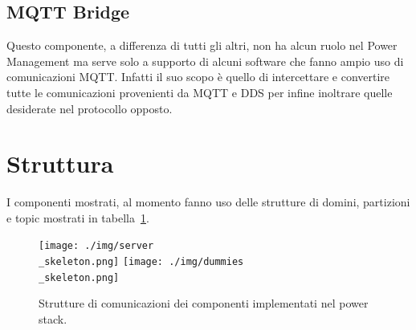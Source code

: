 \subsection*{MQTT Bridge}
Questo componente, a differenza di tutti gli altri, non ha alcun ruolo nel Power Management ma serve solo a supporto di alcuni software che fanno ampio uso di comunicazioni MQTT\cite{mqtt}. Infatti il suo scopo è quello di intercettare e convertire tutte le comunicazioni provenienti da MQTT e DDS per infine inoltrare quelle desiderate nel protocollo opposto.%

\section{Struttura}
I componenti mostrati, al momento fanno uso delle strutture di domini, partizioni e topic mostrati in tabella~\ref{fig:dummy_topic}.

\begin{figure}[H]
    \centering
    \texttt{[image: ./img/server\\\_skeleton.png]}
    \texttt{[image: ./img/dummies\\\_skeleton.png]}
    \caption{Strutture di comunicazioni dei componenti implementati nel power stack.}
    \label{fig:dummy_topic}
\end{figure}
